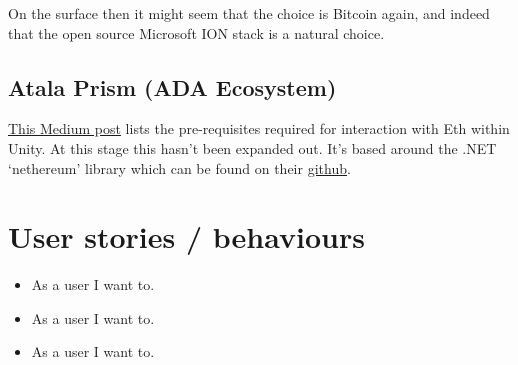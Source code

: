 On the surface then it might seem that the choice is Bitcoin again, and indeed that the open source Microsoft ION stack is a natural choice. 

\subsection{Atala Prism (ADA Ecosystem)}
\href{https://medium.com/coinmonks/part-2-using-nethereum-in-unity-5b09f2d8c718}{This Medium post} lists the pre-requisites required for interaction with Eth within Unity. At this stage this hasn't been expanded out. It's based around the .NET `nethereum' library which can be found on their \href{https://github.com/Nethereum/Nethereum}{github}.    
   
  
\section{User stories / behaviours}
\label{behaviours}

\begin{itemize}
\item As a user I want to.
\item As a user I want to.
\item As a user I want to.
\end{itemize}

